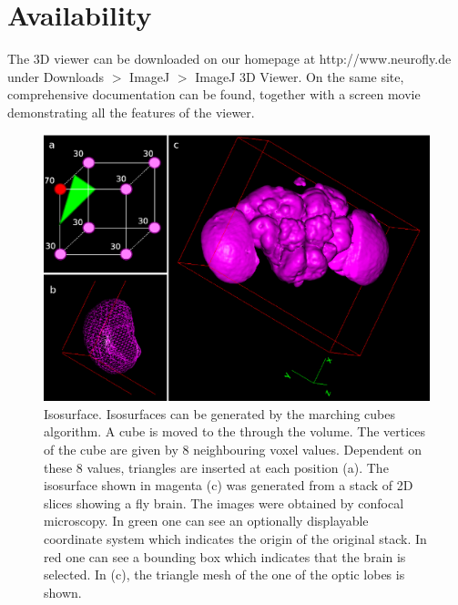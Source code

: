 \documentclass[a4paper,10pt]{article}
\begin{document}
\section{Availability}
The 3D viewer can be downloaded on our homepage at http://www.neurofly.de under Downloads $>$ ImageJ $>$ ImageJ 3D Viewer. On the same site, comprehensive documentation can be found, together with a screen movie demonstrating all the features of the viewer.









\begin{figure}[m]
  \centering
  \includegraphics[width=\textwidth]{images/surface_montage.eps}
  \caption{Isosurface. Isosurfaces can be generated by the marching cubes algorithm. A cube is moved to the through the volume. The vertices of the cube are given by 8 neighbouring voxel values. Dependent on these 8 values, triangles are inserted at each position (a). The isosurface shown in magenta (c) was generated from a stack of 2D slices showing a fly brain. The images were obtained by confocal microscopy. In green one can see an optionally displayable coordinate system which indicates the origin of the original stack. In red one can see a bounding box which indicates that the brain is selected. In (c), the triangle mesh of the one of the optic lobes is shown.}
  \label{fig:surface}
\end{figure}
\end{document}
